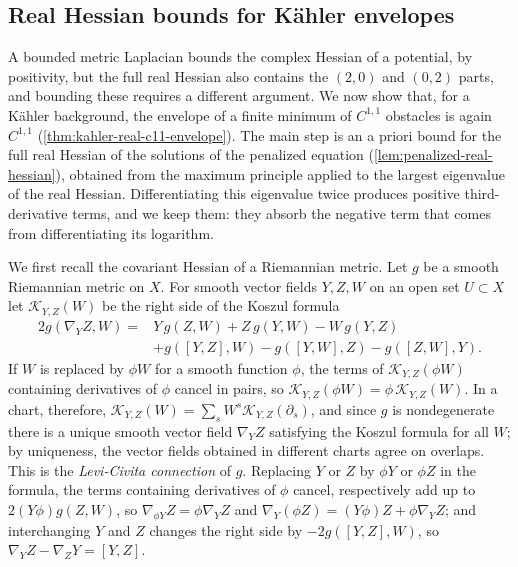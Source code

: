 \subsection{Real Hessian bounds for K\"ahler envelopes}
\label{sec:real-hessian-envelopes}
A bounded metric Laplacian bounds the complex Hessian of a potential, by positivity, but the full real Hessian also contains the $(2,0)$ and $(0,2)$ parts, and bounding these requires a different argument. We now show that, for a K\"ahler background, the envelope of a finite minimum of $C^{1,1}$ obstacles is again $C^{1,1}$ (\cref{thm:kahler-real-c11-envelope}). The main step is an a priori bound for the full real Hessian of the solutions of the penalized equation (\cref{lem:penalized-real-hessian}), obtained from the maximum principle applied to the largest eigenvalue of the real Hessian. Differentiating this eigenvalue twice produces positive third-derivative terms, and we keep them: they absorb the negative term that comes from differentiating its logarithm.

We first recall the covariant Hessian of a Riemannian metric. Let $g$ be a smooth Riemannian metric on $X$. For smooth vector fields $Y,Z,W$ on an open set $U\subset X$ let $\mathcal K_{Y,Z}(W)$ be the right side of the Koszul formula
\begin{align*}
 2g(\nabla_YZ,W)={}&Y\,g(Z,W)+Z\,g(Y,W)-W\,g(Y,Z)\\
 &+g([Y,Z],W)-g([Y,W],Z)-g([Z,W],Y).
\end{align*}
If $W$ is replaced by $\phi W$ for a smooth function $\phi$, the terms of $\mathcal K_{Y,Z}(\phi W)$ containing derivatives of $\phi$ cancel in pairs, so $\mathcal K_{Y,Z}(\phi W)=\phi\,\mathcal K_{Y,Z}(W)$. In a chart, therefore, $\mathcal K_{Y,Z}(W)=\sum_sW^s\mathcal K_{Y,Z}(\partial_s)$, and since $g$ is nondegenerate there is a unique smooth vector field $\nabla_YZ$ satisfying the Koszul formula for all $W$; by uniqueness, the vector fields obtained in different charts agree on overlaps. This is the \emph{Levi-Civita connection} of $g$. Replacing $Y$ or $Z$ by $\phi Y$ or $\phi Z$ in the formula, the terms containing derivatives of $\phi$ cancel, respectively add up to $2(Y\phi)g(Z,W)$, so $\nabla_{\phi Y}Z=\phi\nabla_YZ$ and $\nabla_Y(\phi Z)=(Y\phi)Z+\phi\nabla_YZ$; and interchanging $Y$ and $Z$ changes the right side by $-2g([Y,Z],W)$, so $\nabla_YZ-\nabla_ZY=[Y,Z]$.

